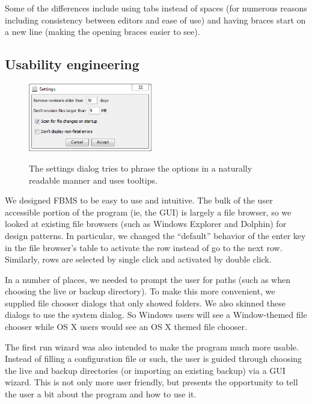 \documentclass[12pt,a4paper]{article}
\begin{document}
Some of the differences include using tabs instead of spaces (for numerous reasons including consistency between editors and ease of use) and having braces start on a new line (making the opening braces easier to see).

\subsection{Usability engineering}
\begin{figure}
\vspace{-20pt}
\begin{center}
\includegraphics[width=0.48\textwidth]{images/settings.png}
\end{center}
\footnotesize{The settings dialog tries to phrase the options in a naturally readable manner and uses tooltips.}
\end{figure}

We designed FBMS to be easy to use and intuitive. The bulk of the user accessible portion of the program (ie, the GUI) is largely a file browser, so we looked at existing file browsers (such as Windows Explorer\cite{explorer} and Dolphin\cite{dolphin}) for design patterns. In particular, we changed the ``default'' behavior of the enter key in the file browser's table to activate the row instead of go to the next row. Similarly, rows are selected by single click and activated by double click.

In a number of places, we needed to prompt the user for paths (such as when choosing the live or backup directory). To make this more convenient, we supplied file chooser dialogs that only showed folders. We also skinned these dialogs to use the system dialog. So Windows users will see a Window-themed file chooser while OS X users would see an OS X themed file chooser.

The first run wizard was also intended to make the program much more usable. Instead of filling a configuration file or such, the user is guided through choosing the live and backup directories (or importing an existing backup) via a GUI wizard. This is not only more user friendly, but presents the opportunity to tell the user a bit about the program and how to use it.
\end{document}
